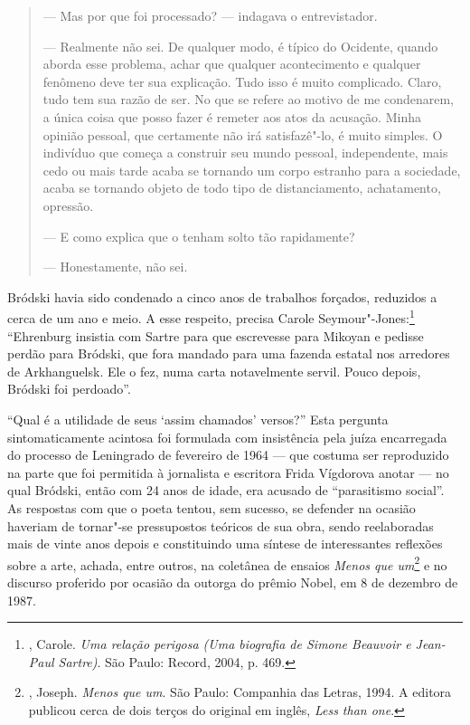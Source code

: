 \begin{quotation}
--- Mas por que foi processado? --- indagava o entrevistador.

--- Realmente não sei. De qualquer modo, é típico do Ocidente, quando
aborda esse problema, achar que qualquer acontecimento e qualquer
fenômeno deve ter sua explicação. Tudo isso é muito complicado. Claro,
tudo tem sua razão de ser. No que se refere ao motivo de me condenarem, a
única coisa que posso fazer é remeter aos atos da acusação. Minha
opinião pessoal, que certamente não irá satisfazê"-lo, é muito simples. O
indivíduo que começa a construir seu mundo pessoal, independente, mais
cedo ou mais tarde acaba se tornando um corpo estranho para a sociedade,
acaba se tornando objeto de todo tipo de distanciamento, achatamento,
opressão.

--- E como explica que o tenham solto tão rapidamente?

--- Honestamente, não sei.
\end{quotation}

Bródski havia sido condenado a cinco anos de trabalhos forçados,
reduzidos a cerca de um ano e meio. A esse respeito, precisa Carole
Seymour"-Jones:\footnote{, Carole. \emph{Uma
 relação perigosa (Uma biografia de Simone Beauvoir e Jean-Paul Sartre)}. São Paulo: Record, 2004, p. 469.} ``Ehrenburg
insistia com Sartre para que escrevesse para Mikoyan e pedisse perdão
para Bródski, que fora mandado para uma fazenda estatal nos arredores de
Arkhanguelsk. Ele o fez, numa carta notavelmente servil. Pouco depois,
Bródski foi perdoado''.

``Qual é a utilidade de seus `assim chamados' versos?'' Esta pergunta sintomaticamente acintosa foi formulada com insistência pela
juíza encarregada do processo de Leningrado de fevereiro de 1964 ---
que costuma ser reproduzido na parte que foi permitida à jornalista e escritora Frida Vígdorova
anotar --- no qual Bródski, então com 24 anos de idade,
era acusado de ``parasitismo social''. As respostas com que o poeta
tentou, sem sucesso, se defender na ocasião haveriam de tornar"-se
pressupostos teóricos de sua obra, sendo reelaboradas mais de vinte anos
depois e constituindo uma síntese de interessantes reflexões
sobre a arte, achada, entre outros, na coletânea de ensaios \emph{Menos que um}\footnote{, Joseph. \emph{Menos que um}. São Paulo: Companhia das Letras, 1994. A editora publicou cerca de dois terços do original em inglês, \emph{Less than one}.} e no discurso proferido por ocasião da outorga do prêmio Nobel, em 8 de dezembro de 1987.

